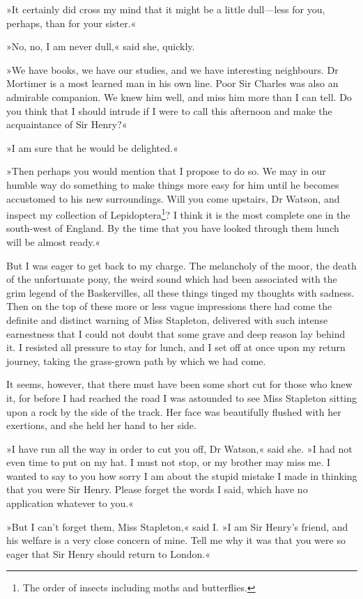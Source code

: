 »It certainly did cross my mind that it might be a little dull\allowbreak---\allowbreak less for you, perhaps, than for your sister.«

»No, no, I am never dull,« said she, quickly.

»We have books, we have our studies, and we have interesting neighbours. Dr Mortimer is a most learned man in his own line. Poor Sir Charles was also an admirable companion. We knew him well, and miss him more than I can tell. Do you think that I should intrude if I were to call this afternoon and make the acquaintance of Sir Henry?«

»I am sure that he would be delighted.«

»Then perhaps you would mention that I propose to do so. We may in our humble way do something to make things more easy for him until he becomes accustomed to his new surroundings. Will you come upstairs, Dr Watson, and inspect my collection of Lepidoptera\footnote{The order of insects including moths and butterflies.}? I think it is the most complete one in the south-west of England. By the time that you have looked through them lunch will be almost ready.«

But I was eager to get back to my charge. The melancholy of the moor, the death of the unfortunate pony, the weird sound which had been associated with the grim legend of the Baskervilles, all these things tinged my thoughts with sadness. Then on the top of these more or less vague impressions there had come the definite and distinct warning of Miss Stapleton, delivered with such intense earnestness that I could not doubt that some grave and deep reason lay behind it. I resisted all pressure to stay for lunch, and I set off at once upon my return journey, taking the grass-grown path by which we had come.

It seems, however, that there must have been some short cut for those who knew it, for before I had reached the road I was astounded to see Miss Stapleton sitting upon a rock by the side of the track. Her face was beautifully flushed with her exertions, and she held her hand to her side.

»I have run all the way in order to cut you off, Dr Watson,« said she. »I had not even time to put on my hat. I must not stop, or my brother may miss me. I wanted to say to you how sorry I am about the stupid mistake I made in thinking that you were Sir Henry. Please forget the words I said, which have no application whatever to you.«

»But I can't forget them, Miss Stapleton,« said I. »I am Sir Hen\-ry's friend, and his welfare is a very close concern of mine. Tell me why it was that you were so eager that Sir Henry should return to London.«

